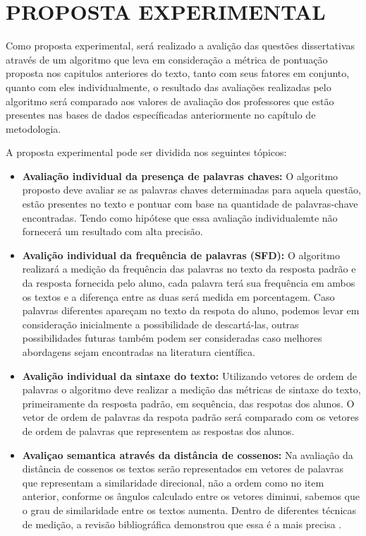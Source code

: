 \chapter{PROPOSTA EXPERIMENTAL}

Como proposta experimental, será realizado a avalição das questões dissertativas através de um algoritmo que leva em consideração a métrica de pontuação proposta nos capitulos anteriores do texto, tanto com seus fatores em conjunto, quanto com eles individualmente, o resultado das avaliações realizadas pelo algoritmo será comparado aos valores de avaliação dos professores que estão presentes nas bases de dados específicadas anteriormente no capítulo de metodologia.

A proposta experimental pode ser dividida nos seguintes tópicos:
\begin{itemize}
	\item \textbf{Avaliação individual da presença de palavras chaves:} O algoritmo proposto deve avaliar se as palavras chaves determinadas para aquela questão, estão presentes no texto e pontuar com base na quantidade de palavras-chave encontradas. Tendo como hipótese que essa avaliação individualemte não fornecerá um resultado com alta precisão.
	\item \textbf{Avalição individual da frequência de palavras (SFD):} O algoritmo realizará a medição da frequência das palavras no texto da resposta padrão e da resposta fornecida pelo aluno, cada palavra terá sua frequência em ambos os textos e a diferença entre as duas será medida em porcentagem. Caso palavras diferentes apareçam no texto da respota do aluno, podemos levar em consideração inicialmente a possibilidade de descartá-las, outras possibilidades futuras também podem ser consideradas caso melhores abordagens sejam encontradas na literatura científica.
	\item \textbf{Avalição individual da sintaxe do texto:} Utilizando vetores de ordem de palavras o algoritmo deve realizar a medição das métricas de sintaxe do texto, primeiramente da resposta padrão, em sequência, das respotas dos alunos. O vetor de ordem de palavras da respota padrão será comparado com os vetores de ordem de palavras que representem as respostas dos alunos.
	\item \textbf{Avaliçao semantica através da distância de cossenos:} Na avaliação da distância de cossenos  os textos serão representados em vetores de palavras que representam a similaridade direcional, não a ordem como no item anterior, conforme os ângulos calculado entre os vetores diminui, sabemos que o grau de similaridade entre os textos aumenta. Dentro de diferentes técnicas de medição, a revisão bibliográfica demonstrou que essa é a mais precisa \cite{SemanticSimilarityBasedDescriptiveAnswerEvaluation}.
\end{itemize}

